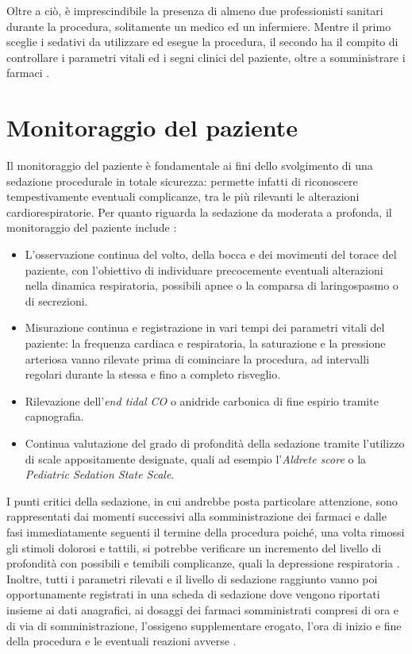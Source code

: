 Oltre a ciò, è imprescindibile la presenza di almeno due professionisti sanitari durante la procedura, solitamente un medico ed un infermiere. Mentre il primo sceglie i sedativi da utilizzare ed esegue la procedura, il secondo ha il compito di controllare i parametri vitali ed i segni clinici del paziente, oltre a somministrare i farmaci \cite{Krauss2006, Simeupsedazione}. 

\section{Monitoraggio del paziente}

Il monitoraggio del paziente è fondamentale ai fini dello svolgimento di una sedazione procedurale in totale sicurezza: permette infatti di riconoscere tempestivamente eventuali complicanze, tra le più rilevanti le alterazioni cardiorespiratorie. 
Per quanto riguarda la sedazione da moderata a profonda, il monitoraggio del paziente include \cite{Krauss2006, Simeupsedazione}: 

\begin{itemize}
    \item L'osservazione continua del volto, della bocca e dei movimenti del torace del paziente, con l'obiettivo di individuare precocemente eventuali alterazioni nella dinamica respiratoria, possibili apnee o la comparsa di laringospasmo o di secrezioni.
    \item Misurazione continua e registrazione in vari tempi dei parametri vitali del paziente: la frequenza cardiaca e respiratoria, la saturazione e la pressione arteriosa vanno rilevate prima di cominciare la procedura, ad intervalli regolari durante la stessa e fino a completo risveglio. 
    \item Rilevazione dell'\emph{end tidal CO} o anidride carbonica di fine espirio tramite capnografia.
    \item Continua valutazione del grado di profondità della sedazione tramite l'utilizzo di scale appositamente designate, quali ad esempio l'\emph{Aldrete score} o la \emph{Pediatric Sedation State Scale}.
\end{itemize} 

I punti critici della sedazione, in cui andrebbe posta particolare attenzione, sono rappresentati dai momenti successivi alla somministrazione dei farmaci e dalle fasi immediatamente seguenti il termine della procedura poiché, una volta rimossi gli stimoli dolorosi e tattili, si potrebbe verificare un incremento del livello di profondità con possibili e temibili complicanze, quali la depressione respiratoria \cite{Daud2014}. 
\\Inoltre, tutti i parametri rilevati e il livello di sedazione raggiunto vanno poi opportunamente registrati in una scheda di sedazione dove vengono riportati insieme ai dati anagrafici, ai dosaggi dei farmaci somministrati compresi di ora e di via di somministrazione, l'ossigeno supplementare erogato, l'ora di inizio e fine della procedura e le eventuali reazioni avverse \cite{Guidelines2019, Simeupsedazione}. 


